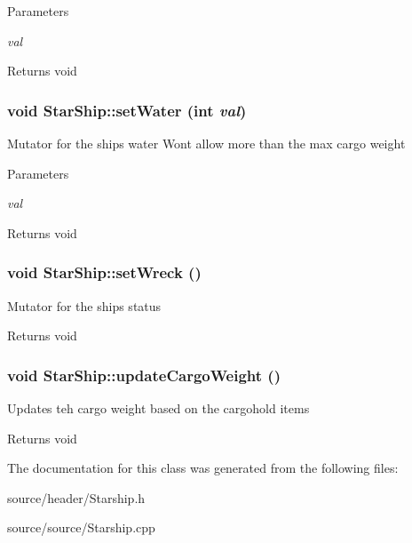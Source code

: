 \begin{DoxyParams}{Parameters}
\item[{\em val}]\end{DoxyParams}
\begin{DoxyReturn}{Returns}
void 
\end{DoxyReturn}
\hypertarget{classStarShip_a61a1341a3e3640eea186cedae52fbd0e}{
\subsubsection[{setWater}]{\setlength{\rightskip}{0pt plus 5cm}void StarShip::setWater (int {\em val})}}
\label{da/d97/classStarShip_a61a1341a3e3640eea186cedae52fbd0e}
Mutator for the ships water Wont allow more than the max cargo weight


\begin{DoxyParams}{Parameters}
\item[{\em val}]\end{DoxyParams}
\begin{DoxyReturn}{Returns}
void 
\end{DoxyReturn}
\hypertarget{classStarShip_ae9dbbdaa20a964e2befe24475173651b}{
\subsubsection[{setWreck}]{\setlength{\rightskip}{0pt plus 5cm}void StarShip::setWreck ()}}
\label{da/d97/classStarShip_ae9dbbdaa20a964e2befe24475173651b}
Mutator for the ships status

\begin{DoxyReturn}{Returns}
void 
\end{DoxyReturn}
\hypertarget{classStarShip_ad1a29b9f7ee09f56a78b9994830241b6}{
\subsubsection[{updateCargoWeight}]{\setlength{\rightskip}{0pt plus 5cm}void StarShip::updateCargoWeight ()}}
\label{da/d97/classStarShip_ad1a29b9f7ee09f56a78b9994830241b6}
Updates teh cargo weight based on the cargohold items

\begin{DoxyReturn}{Returns}
void 
\end{DoxyReturn}


The documentation for this class was generated from the following files:\begin{DoxyCompactItemize}
\item 
source/header/Starship.h\item 
source/source/Starship.cpp\end{DoxyCompactItemize}
